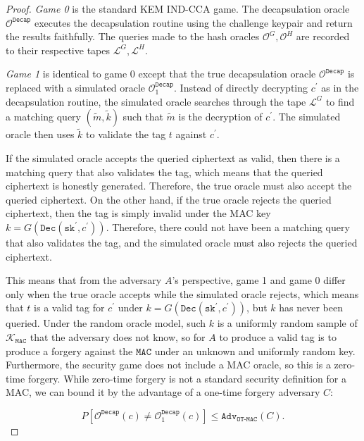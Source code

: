 \documentclass[runningheads]{llncs}
\newcommand{\decrypt}{\texttt{Dec}}
\newcommand{\decap}{\texttt{Decap}}
\newcommand{\mac}{\texttt{MAC}}
\newcommand{\sk}{\texttt{sk}}
\newcommand{\adv}{\texttt{Adv}}
\begin{document}
\begin{proof}
    \emph{Game 0} is the standard KEM IND-CCA game. The decapsulation oracle $\mathcal{O}^\decap$ executes the decapsulation routine using the challenge keypair and return the results faithfully. The queries made to the hash oracles $\mathcal{O}^G, \mathcal{O}^H$ are recorded to their respective tapes $\mathcal{L}^G, \mathcal{L}^H$.

    \emph{Game 1} is identical to game 0 except that the true decapsulation oracle $\mathcal{O}^\decap$ is replaced with a simulated oracle $\mathcal{O}^\decap_1$. Instead of directly decrypting $c^\prime$ as in the decapsulation routine, the simulated oracle searches through the tape $\mathcal{L}^G$ to find a matching query $(\tilde{m}, \tilde{k})$ such that $\tilde{m}$ is the decryption of $c^\prime$. The simulated oracle then uses $\tilde{k}$ to validate the tag $t$ against $c^\prime$.

    If the simulated oracle accepts the queried ciphertext as valid, then there is a matching query that also validates the tag, which means that the queried ciphertext is honestly generated. Therefore, the true oracle must also accept the queried ciphertext. On the other hand, if the true oracle rejects the queried ciphertext, then the tag is simply invalid under the MAC key $k = G(\decrypt(\sk^\prime, c^\prime))$. Therefore, there could not have been a matching query that also validates the tag, and the simulated oracle must also rejects the queried ciphertext.

    This means that from the adversary $A$'s perspective, game 1 and game 0 differ only when the true oracle accepts while the simulated oracle rejects, which means that $t$ is a valid tag for $c^\prime$ under $k = G(\decrypt(\sk^\prime, c^\prime))$, but $k$ has never been queried. Under the random oracle model, such $k$ is a uniformly random sample of $\mathcal{K}_\mac$ that the adversary does not know, so for $A$ to produce a valid tag is to produce a forgery against the $\mac$ under an unknown and uniformly random key. Furthermore, the security game does not include a MAC oracle, so this is a zero-time forgery. While zero-time forgery is not a standard security definition for a MAC, we can bound it by the advantage of a one-time forgery adversary $C$:

    \begin{equation*}
        P\left[\mathcal{O}^\decap(c) \neq \mathcal{O}^\decap_1(c)\right]
        \leq \adv_\texttt{OT-MAC}(C).
    \end{equation*}


\end{proof}
\end{document}
